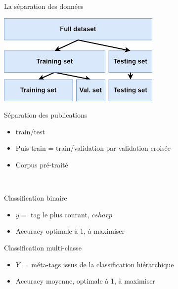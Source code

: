 \documentclass[10pt]{beamer}
\begin{document}
\begin{frame}{La séparation des données}
    \begin{minipage}{0.35\linewidth}
        \begin{center}
           \includegraphics[width=\linewidth]{illustrations/train_test_split.png}
        \end{center}
    \end{minipage}
    \hfill
    \begin{minipage}{0.6\linewidth}
        Séparation des publications
        \begin{itemize}
            \item train/test
            \item Puis train = train/validation par validation croisée\\
            \item Corpus pré-traité
        \end{itemize}\\
    \end{minipage}

    \vspace{0.5cm}
    
    \begin{minipage}{0.48\linewidth}
        Classification binaire
        \begin{itemize}
            \item $y = $ tag le plus courant, $csharp$
            \item Accuracy optimale à 1, à maximiser
        \end{itemize}
    \end{minipage}
    \vline
    \hfill
    \begin{minipage}{0.48\linewidth}
        Classification multi-classe
        \begin{itemize}
            \item $Y = $ méta-tags issus de la classification hiérarchique
            \item Accuracy moyenne, optimale à 1, à maximiser
        \end{itemize}
    \end{minipage}
\end{frame}
\end{document}
